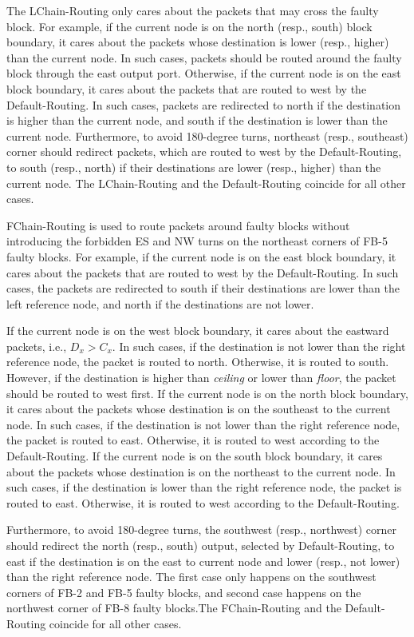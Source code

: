 The LChain-Routing only cares about the packets that may cross the faulty block. For example, if the current node is on the north (resp., south) block boundary, it cares about the packets whose destination is lower (resp., higher) than the current node. In such cases, packets should be routed around the faulty block through the east output port. Otherwise, if the current node is on the east block boundary, it cares about the packets that are routed to west by the Default-Routing. In such cases, packets are redirected to north if the destination is higher than the current node, and south if the destination is lower than the current node. Furthermore, to avoid 180-degree turns, northeast (resp., southeast) corner should redirect packets, which are routed to west by the Default-Routing, to south (resp., north) if their destinations are lower (resp., higher) than the current node. The LChain-Routing and the Default-Routing coincide for all other cases. 

FChain-Routing is used to route packets around faulty blocks without introducing the forbidden ES and NW turns on the northeast corners of FB-5 faulty blocks. For example, if the current node is on the east block boundary, it cares about the packets that are routed to west by the Default-Routing. In such cases, the packets are redirected to south if their destinations are lower than the left reference node, and north if the destinations are not lower.

If the current node is on the west block boundary, it cares about the eastward packets, i.e., $D_{x} > C_{x}$. In such cases, if the destination is not lower than the right reference node, the packet is routed to north. Otherwise, it is routed to south. However, if the destination is higher than \textit{ceiling} or lower than \textit{floor}, the packet should be routed to west first. If the current node is on the north block boundary, it cares about the packets whose destination is on the southeast to the current node. In such cases, if the destination is not lower than the right reference node, the packet is routed to east. Otherwise, it is routed to west according to the Default-Routing. If the current node is on the south block boundary, it cares about the packets whose destination is on the northeast to the current node. In such cases, if the destination is lower than the right reference node, the packet is routed to east. Otherwise, it is routed to west according to the Default-Routing. 

Furthermore, to avoid 180-degree turns, the southwest (resp., northwest) corner should redirect the north (resp., south) output, selected by Default-Routing, to east if the destination is on the east to current node and lower (resp., not lower) than the right reference node. The first case only happens on the southwest corners of FB-2 and FB-5 faulty blocks, and second case happens on the northwest corner of FB-8 faulty blocks.The FChain-Routing and the Default-Routing coincide for all other cases. 

